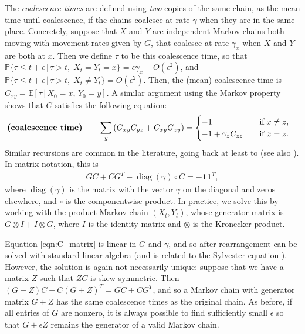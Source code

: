 \documentclass{article}
\DeclareMathOperator{\diag}{\mathop{\mbox{diag}}}
\renewcommand{\P}{\mathbb{P}}
\newcommand{\E}{\mathbb{E}}
\newcommand{\given}{\,\vert\,}
\newcommand{\bone}{\mathbf{1}}
\begin{document}
The \emph{coalescence times} are defined using \emph{two} copies of the same chain,
as the mean time until coalescence,
if the chains coalesce at rate $\gamma$ when they are in the same place.
Concretely, 
suppose that $X$ and $Y$ are independent Markov chains both moving with movement rates given by $G$,
that coalesce at rate $\gamma_x$ when $X$ and $Y$ are both at $x$.
Then we define $\tau$ to be this coalescence time,
so that 
$\P\{\tau \le t + \epsilon \given \tau > t, \; X_t = Y_t = x\} = \epsilon \gamma_x + O(\epsilon^2)$,
and 
$\P\{\tau \le t + \epsilon \given \tau > t, \; X_t \neq Y_t\} = O(\epsilon^2)$.
Then, the (mean) coalescence time is $C_{xy} = \E[\tau \given X_0 = x, \, Y_0 = y]$.
A similar argument using the Markov property
shows that $C$ satisfies the following equation:
\begin{align}
\text{\bf (coalescence time)} \qquad
    \sum_y \left(G_{xy} C_{yz} + C_{xy} G_{zy}\right)
    &=
    \begin{cases}
        -1                   \quad & \text{if} \; x \neq z, \\
        -1 + \gamma_z C_{zz} \quad & \text{if} \; x = z.
    \end{cases}
\end{align}
Similar recursions are common in the literature,
going back at least to \citet{hill1972effective} (see also \citet{whitlock1997effective}).
In matrix notation, this is
\begin{align} \label{eqn:C_matrix}
    G C + C G^T - \diag(\gamma) \circ C = -\bone \bone^T,
\end{align}
where $\diag(\gamma)$ is the matrix with the vector $\gamma$ on the diagonal and zeros elsewhere,
and $\circ$ is the componentwise product.
In practice, we solve this by working with the product Markov chain $(X_t, Y_t)$,
whose generator matrix is $G \otimes I + I \otimes G$, 
where $I$ is the identity matrix and $\otimes$ is the Kronecker product.

Equation \eqref{eqn:C_matrix} is linear in $G$ and $\gamma$,
and so after rearrangement can be solved with standard linear algebra
(and is related to the Sylvester equation \citep{bhatia1997solve}).
However, the solution is again not necessarily unique:
suppose that we have a matrix $Z$ such that $ZC$ is skew-symmetric.
Then $(G + Z) C + C (G + Z)^T = GC + CG^T$,
and so a Markov chain with generator matrix $G + Z$ has the same coalescence times
as the original chain.
As before, if all entries of $G$ are nonzero, 
it is always possible to find sufficiently small $\epsilon$
so that $G + \epsilon Z$ remains the generator of a valid Markov chain.
\end{document}

